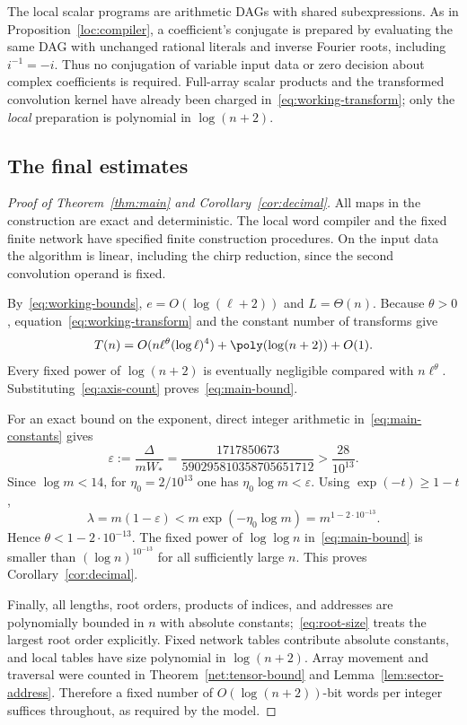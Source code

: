 The local scalar programs are arithmetic DAGs with shared subexpressions.
As in Proposition~\ref{loc:compiler}, a coefficient's conjugate is prepared
by evaluating the same DAG with unchanged rational literals and inverse
Fourier roots, including $i^{-1}=-i$. Thus no conjugation of variable
input data or zero decision about complex coefficients is required.
Full-array scalar products and the transformed convolution kernel have
already been charged in~\eqref{eq:working-transform}; only the
\emph{local} preparation is polynomial in $\log(n+2)$.

\subsection{The final estimates}

\begin{proof}[Proof of Theorem~\ref{thm:main} and Corollary~\ref{cor:decimal}]
All maps in the construction are exact and deterministic. The local word compiler and the fixed finite network have specified finite construction procedures. On the input data the algorithm is linear, including the chirp reduction, since the second convolution operand is fixed.

By~\eqref{eq:working-bounds}, $e=O(\log(\ell+2))$ and $L=\Theta(n)$. Because $\theta>0$, equation~\eqref{eq:working-transform} and the constant number of transforms give
\[
 T(n)=O(n\ell^\theta(\log\ell)^4)
       +\poly(\log(n+2))+O(1).
\]
Every fixed power of $\log(n+2)$ is eventually negligible compared with $n\ell^\theta$. Substituting~\eqref{eq:axis-count} proves~\eqref{eq:main-bound}.

For an exact bound on the exponent, direct integer arithmetic in~\eqref{eq:main-constants} gives
\[
 \varepsilon:=\frac{\Delta}{mW_*}
   =\frac{1717850673}{590295810358705651712}
   >\frac{28}{10^{13}}.
\]
Since $\log m<14$, for $\eta_0=2/10^{13}$ one has $\eta_0\log m<\varepsilon$. Using $\exp(-t)\ge1-t$,
\[
 \lambda=m(1-\varepsilon)<m\exp(-\eta_0\log m)
       =m^{1-2\cdot10^{-13}}.
\]
Hence $\theta<1-2\cdot10^{-13}$. The fixed power of $\log\log n$ in~\eqref{eq:main-bound} is smaller than $(\log n)^{10^{-13}}$ for all sufficiently large $n$. This proves Corollary~\ref{cor:decimal}.

Finally, all lengths, root orders, products of indices, and addresses are polynomially bounded in $n$ with absolute constants;~\eqref{eq:root-size} treats the largest root order explicitly. Fixed network tables contribute absolute constants, and local tables have size polynomial in $\log(n+2)$. Array movement and traversal were counted in Theorem~\ref{net:tensor-bound} and Lemma~\ref{lem:sector-address}. Therefore a fixed number of $O(\log(n+2))$-bit words per integer suffices throughout, as required by the model.
\end{proof}

